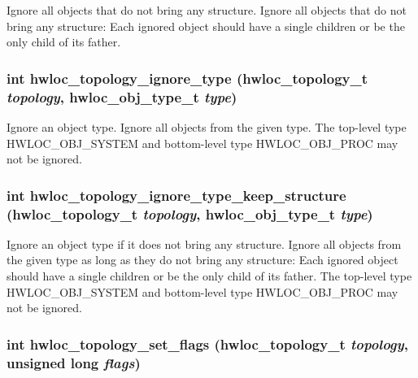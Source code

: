 Ignore all objects that do not bring any structure. Ignore all objects that do not bring any structure: Each ignored object should have a single children or be the only child of its father. \hypertarget{group__hwlocality__configuration_gafcf30842e8cb47b4c3dcaebecea31e17}{
\subsubsection[{hwloc\_\-topology\_\-ignore\_\-type}]{\setlength{\rightskip}{0pt plus 5cm}int hwloc\_\-topology\_\-ignore\_\-type ({\bf hwloc\_\-topology\_\-t} {\em topology}, \/  {\bf hwloc\_\-obj\_\-type\_\-t} {\em type})}}
\label{group__hwlocality__configuration_gafcf30842e8cb47b4c3dcaebecea31e17}


Ignore an object type. Ignore all objects from the given type. The top-\/level type HWLOC\_\-OBJ\_\-SYSTEM and bottom-\/level type HWLOC\_\-OBJ\_\-PROC may not be ignored. \hypertarget{group__hwlocality__configuration_ga1f987bca941d6949faf7b1554dd7bc12}{
\subsubsection[{hwloc\_\-topology\_\-ignore\_\-type\_\-keep\_\-structure}]{\setlength{\rightskip}{0pt plus 5cm}int hwloc\_\-topology\_\-ignore\_\-type\_\-keep\_\-structure ({\bf hwloc\_\-topology\_\-t} {\em topology}, \/  {\bf hwloc\_\-obj\_\-type\_\-t} {\em type})}}
\label{group__hwlocality__configuration_ga1f987bca941d6949faf7b1554dd7bc12}


Ignore an object type if it does not bring any structure. Ignore all objects from the given type as long as they do not bring any structure: Each ignored object should have a single children or be the only child of its father. The top-\/level type HWLOC\_\-OBJ\_\-SYSTEM and bottom-\/level type HWLOC\_\-OBJ\_\-PROC may not be ignored. \hypertarget{group__hwlocality__configuration_gaaeed4df656979e5f16befea9d29b814b}{
\subsubsection[{hwloc\_\-topology\_\-set\_\-flags}]{\setlength{\rightskip}{0pt plus 5cm}int hwloc\_\-topology\_\-set\_\-flags ({\bf hwloc\_\-topology\_\-t} {\em topology}, \/  unsigned long {\em flags})}}
\label{group__hwlocality__configuration_gaaeed4df656979e5f16befea9d29b814b}


